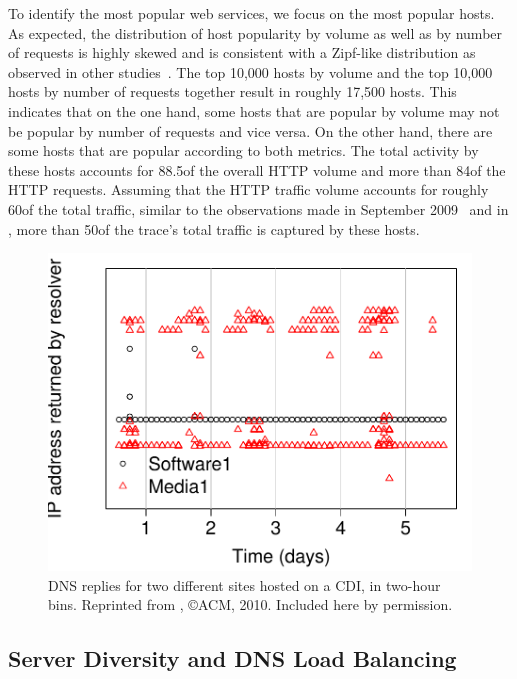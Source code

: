 To identify the most popular web services, we focus on the most popular hosts.
As expected, the distribution of host popularity by volume as well as by number
of requests is highly skewed and is consistent with a Zipf-like distribution as
observed in other studies~\cite{OnDominantCharacteristics2009}. The top 10,000
hosts by volume and the top 10,000 hosts by number of requests together result
in roughly 17,500 hosts.  This indicates that on the one hand, some hosts that
are popular by volume may not be popular by number of requests and vice versa.
On the other hand, there are some hosts that are popular according to both
metrics.  The total activity by these hosts accounts for 88.5\perc of the
overall HTTP volume and more than 84\perc of the HTTP requests. Assuming that
the HTTP traffic volume accounts for roughly 60\perc of the total traffic,
similar to the observations made in September 2009~\cite{OnDominantCharacteristics2009,UGCcacheability} 
and in \martrace, more than 50\perc of the trace's total traffic is captured by
these hosts.

\begin{figure}[htbp]
  \centering
  \includegraphics[height=0.7\linewidth]{figures-pdf/dns-diversity}
  \caption{DNS replies for two different sites hosted on a CDI, in two-hour bins.  Reprinted from \cite{PADIS2010}, \copyright ACM, 2010. Included here by permission.}%
  \label{fig:dns_diversity}
\end{figure}


\subsection{Server Diversity and DNS Load Balancing}\label{sec:active_dns_measurement} 

